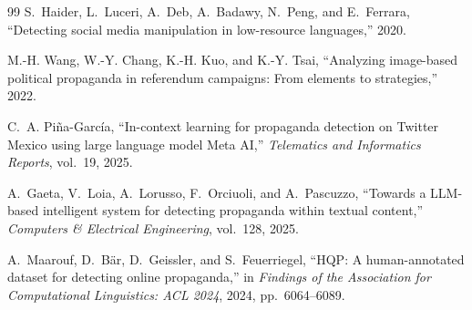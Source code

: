 \documentclass[12pt,a4paper]{report}
\begin{document}
\begin{thebibliography}{99}
 S.~Haider, L.~Luceri, A.~Deb, A.~Badawy, N.~Peng, and E.~Ferrara, ``Detecting social media manipulation in low-resource languages,'' 2020.

 M.-H. Wang, W.-Y. Chang, K.-H. Kuo, and K.-Y. Tsai, ``Analyzing image-based political propaganda in referendum campaigns: From elements to strategies,'' 2022.

 C.~A. Pi\~na-Garc\'ia, ``In-context learning for propaganda detection on Twitter Mexico using large language model Meta AI,'' \emph{Telematics and Informatics Reports}, vol.~19, 2025.

 A.~Gaeta, V.~Loia, A.~Lorusso, F.~Orciuoli, and A.~Pascuzzo, ``Towards a LLM-based intelligent system for detecting propaganda within textual content,'' \emph{Computers \& Electrical Engineering}, vol.~128, 2025.

 A.~Maarouf, D.~B\"ar, D.~Geissler, and S.~Feuerriegel, ``HQP: A human-annotated dataset for detecting online propaganda,'' in \emph{Findings of the Association for Computational Linguistics: ACL 2024}, 2024, pp.~6064--6089.

\end{thebibliography}
\end{document}
